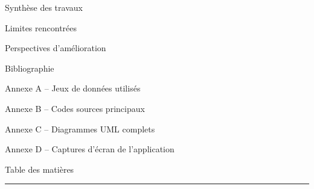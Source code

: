 \documentclass[12pt,a4paper]{report}
\begin{document}
	\begin{list}{}{%
			\setlength{\leftmargin}{1.5em}
			\setlength{\itemsep}{2pt}
		}
		\item Synth\`ese des travaux
		\item Limites rencontr\'ees
		\item Perspectives d'am\'elioration
	\end{list}
	
	\vspace{0.8cm}
	
	
	\noindent
	\colorbox{bleuPrincipal}{%
		\parbox{\linewidth}{%
			\vspace{3pt}
			\hfill{}
			\vspace{3pt}
		}%
	}
	
	\vspace{3pt}
	\begin{list}{}{%
			\setlength{\leftmargin}{0pt}
			\setlength{\itemsep}{4pt}
		}
		\item Bibliographie \dotfill
		\item Annexe A \; -- \; Jeux de donn\'ees utilis\'es \dotfill
		\item Annexe B \; -- \; Codes sources principaux \dotfill
		\item Annexe C \; -- \; Diagrammes UML complets \dotfill
		\item Annexe D \; -- \; Captures d'\'ecran de l'application \dotfill
		\item Table des mati\`eres \dotfill
	\end{list}
	
	\vspace{0.6cm}
	\noindent\textcolor{bleuPrincipal}{\rule{\linewidth}{0.8pt}}
	
\end{document}
